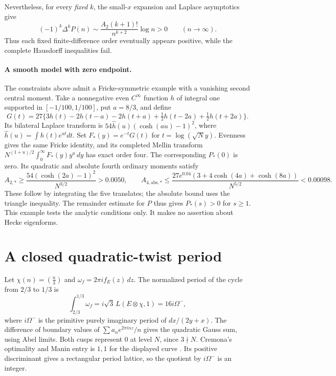 \documentclass[11pt]{article}
\begin{document}
Nevertheless, for every \emph{fixed} \(k\), the small-\(x\) expansion and
Laplace asymptotics give
\[
 (-1)^k\Delta^kP(n)
 \sim\frac{A_2(k+1)!}{n^{k+2}}\log n>0
 \qquad(n\to\infty).
\]
Thus each fixed finite-difference order eventually appears
positive, while the complete Hausdorff inequalities fail.


\paragraph{A smooth model with zero endpoint.}
The constraints above admit a Fricke-symmetric example with a vanishing
second central moment. Take a nonnegative even \(C^\infty\) function
\(h\) of integral one supported in \([-1/100,1/100]\), put
\(a=8/3\), and define
\[
G(t)=27\{3h(t)-2h(t-a)-2h(t+a)
               +\tfrac12 h(t-2a)+\tfrac12 h(t+2a)\}.
\]
Its bilateral Laplace transform is
\(54\widehat h(u)(\cosh(au)-1)^2\), where
\(\widehat h(u)=\int h(t)e^{ut}dt\).
Set \(F_*(y)=e^{-t}G(t)\) for \(t=\log(\sqrt N y)\). Evenness gives
the same Fricke identity, and its completed Mellin transform
\(N^{(1+u)/2}\int_0^\infty F_*(y)y^u\,dy\) has exact order four.
The corresponding \(P_*(0)\) is zero. Its quadratic and absolute
fourth ordinary moments satisfy
\[
 A_{2,*}\ge \frac{54(\cosh(2a)-1)^2}{N^{3/2}}>0.0050,\qquad
 A_{4,\mathrm{abs},*}
 \le\frac{27e^{0.04}(3+4\cosh(4a)+\cosh(8a))}{N^{5/2}}
 <0.00098.
\]
These follow by integrating the five translates; the absolute bound
uses the triangle inequality. The remainder estimate for \(P\) thus
gives \(P_*(s)>0\) for \(s\ge1\). This example tests the analytic
conditions only. It makes no assertion about Hecke eigenforms.

\section{A closed quadratic-twist period}
Let \(\chi(n)=(\frac{n}{3})\) and \(\omega_f=2\pi i f_E(z)\,dz\).
The normalized period of the cycle from \(2/3\) to \(1/3\) is
\[
\int_{2/3}^{1/3}\omega_f=i\sqrt3\,L(E\otimes\chi,1)
                         =16i\Omega^-,
\]
where \(i\Omega^-\) is the primitive purely imaginary period of
\(dx/(2y+x)\). The difference of boundary values of
\(\sum a_n e^{2\pi inz}/n\) gives the quadratic Gauss sum, using Abel
limits. Both cusps represent \(0\) at level \(N\), since \(3\nmid N\).
Cremona's optimality and Manin entry is \(1,1\) for the displayed
curve \cite{Cremona}. Its positive discriminant gives a rectangular
period lattice, so the quotient by \(i\Omega^-\) is an integer.
\end{document}
